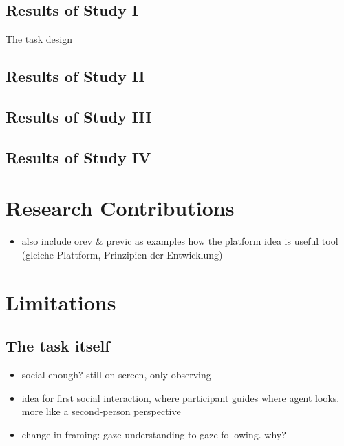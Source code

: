 \documentclass[
]{scrbook}
\providecommand{\tightlist}{%
  \setlength{\itemsep}{0pt}\setlength{\parskip}{0pt}}
\begin{document}
\subsection{Results of Study I}\label{resultsI}

The task design

\subsection{Results of Study II}\label{resultsII}

\subsection{Results of Study III}\label{resultsIII}

\subsection{Results of Study IV}\label{resultsIV}

\section{Research Contributions}\label{research-contributions}

\begin{itemize}
\tightlist
\item
  also include orev \& previc as examples how the platform idea is useful tool (gleiche Plattform, Prinzipien der Entwicklung)
\end{itemize}

\section{Limitations}\label{limitations}

\subsection{The task itself}\label{the-task-itself}

\begin{itemize}
\tightlist
\item
  social enough? still on screen, only observing
\item
  idea for first social interaction, where participant guides where agent looks. more like a second-person perspective
\item
  change in framing: gaze understanding to gaze following. why?
\end{itemize}
\end{document}
